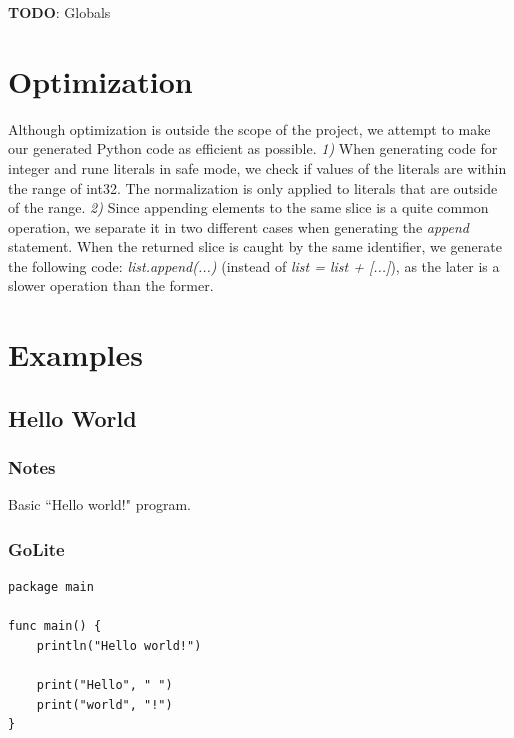 \documentclass{article}
\begin{document}
\textbf{TODO}: Globals

\section{Optimization}

Although optimization is outside the scope of the project, we attempt to
make our generated Python code as efficient as possible. \textit{1)} When
generating code for integer and rune literals in safe mode, we check if
values of the literals are within the range of int32. The normalization 
is only applied to literals that are outside of the range. \textit{2)}
Since appending elements to the same slice is a quite common operation,
we separate it in two different cases when generating the \textit{append}
statement. When the returned slice is caught by the same identifier, we
generate the following code: \textit{list.append(...)} (instead of
\textit{list = list + [...]}), as the later is a slower operation than 
the former.

\section{Examples}

\subsection{Hello World}
\subsubsection{Notes}
Basic ``Hello world!" program.

\subsubsection{GoLite}
\begin{lstlisting}
package main

func main() {
    println("Hello world!")

    print("Hello", " ")
    print("world", "!")
}
\end{lstlisting}
\end{document}
